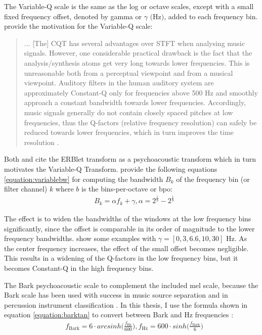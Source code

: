 \documentclass[report.tex]{subfiles}
\begin{document}
The Variable-Q scale \parencite{variableq1, variableq2} is the same as the log or octave scales, except with a small fixed frequency offset, denoted by gamma or $\gamma \text{ (Hz)}$, added to each frequency bin. \citeauthor{variableq1} provide the motivation for the Variable-Q scale:
\begin{quote}
	... [The] CQT has several advantages over STFT when analysing music signals. However, one considerable practical drawback is the fact that the analysis/synthesis atoms get very long towards lower frequencies. This is unreasonable both from a perceptual viewpoint and from a musical viewpoint. Auditory filters in the human auditory system are approximately Constant-Q only for frequencies above 500 Hz and smoothly approach a constant bandwidth towards lower frequencies. Accordingly, music signals generally do not contain closely spaced pitches at low frequencies, thus the Q-factors (relative frequency resolution) can safely be reduced towards lower frequencies, which in turn improves the time resolution \parencite[5]{variableq1}.
\end{quote}

Both \textcite{variableq1} and \textcite{variableq2} cite the ERBlet transform \parencite{erblet} as a psychoacoustic transform which in turn motivates the Variable-Q Transform. \textcite{variableq1, variableq2} provide the following equations \eqref{equation:variablebw} for computing the bandwidth $B_{k}$ of the frequency bin (or filter channel) $k$ where $b$ is the bins-per-octave or bpo:
\begin{align}\tag{25}\label{equation:variablebw}
	\nonumber & B_{k} = \alpha f_{k} + \gamma, \alpha = 2^{\frac{1}{b}} - 2^{\frac{1}{b}}
\end{align}

The effect is to widen the bandwidths of the windows at the low frequency bins significantly, since the offset is comparable in its order of magnitude to the lower frequency bandwidths. \textcite{variableq1} show some examples with $\gamma = [0, 3, 6.6, 10, 30] \text{ Hz}$. As the center frequency increases, the effect of the small offset becomes negligible. This results in a widening of the Q-factors in the low frequency bins, but it becomes Constant-Q in the high frequency bins. 

The Bark psychoacoustic scale to complement the included mel scale, because the Bark scale has been used with success in music source separation \parencite{barkjust1} and in percussion instrument classification \parencite{barkjust2}. In this thesis, I use the formula shown in equation \eqref{equation:barktan} to convert between Bark and Hz frequencies \parencite{barktan}:
\begin{align}\tag{26}\label{equation:barktan}
	\nonumber & f_{\text{Bark}} = 6 \cdot arcsinh \Big(\frac{f_{\text{Hz}}}{600}\Big), f_{\text{Hz}} = 600 \cdot sinh \Big(\frac{f_{\text{Bark}}}{6}\Big)
\end{align}
\end{document}
